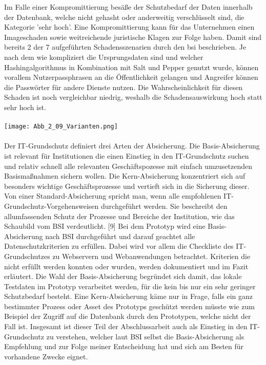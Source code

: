 Im Falle einer Kompromittierung besäße der Schutzbedarf der Daten innerhalb der Datenbank, welche nicht gehasht oder anderweitig verschlüsselt sind, die Kategorie 'sehr hoch'. Eine Kompromittierung kann für das Unternehmen einen Imageschaden sowie weitreichende juristische Klagen zur Folge haben. Damit sind bereits 2 der 7 aufgeführten Schadensszenarien durch den \ac{bsi} beschrieben. Je nach dem wie kompliziert die Ursprungsdaten sind und welcher Hashingalgorithmus in Kombination mit Salt und Pepper genutzt wurde, können vorallem Nutzerpassphrasen an die Öffentlichkeit gelangen und Angreifer können die Passwörter für andere Dienste nutzen. Die Wahrscheinlichkeit für diesen Schaden ist noch vergleichbar niedrig, weshalb die Schadensauswirkung hoch statt sehr hoch ist. \\ \\
\texttt{[image: Abb\_2\_09\_Varianten.png]} \\
\\
Der IT-Grundschutz definiert drei Arten der Absicherung. Die Basis-Absicherung ist relevant für Institutionen die einen Einstieg in den IT-Grundschutz suchen und relativ schnell alle relevanten Geschäftspozesse mit einfach umzusetzenden Basismaßnahmen sichern wollen. Die Kern-Absicherung konzentriert sich auf besonders wichtige Geschäftsprozesse und vertieft sich in die Sicherung dieser. Von einer Standard-Absicherung spricht man, wenn alle empfohlenen IT-Grundschutz-Vorgehensweisen durchgeführt werden. Sie beschreibt den allumfassenden Schutz der Prozesse und Bereiche der Institution, wie das Schaubild vom BSI verdeutlicht. [9] Bei dem Prototyp wird eine Basis-Absicherung nach BSI durchgeführt und darauf geachtet alle Datenschutzkriterien zu erfüllen. Dabei wird vor allem die Checkliste des IT-Grundschutzes zu Webservern und Webanwendungen betrachtet. Kriterien die nicht erfüllt werden konnten oder wurden, werden dokumentiert und im Fazit erläutert. Die Wahl der Basis-Absicherung begründet sich damit, das lokale Testdaten im Prototyp verarbeitet werden, für die kein bis nur ein sehr geringer Schutzbedarf besteht. Eine Kern-Absicherung käme nur in Frage, falls ein ganz bestimmter Prozess oder Asset des Prototyps geschützt werden müsste wie zum Beispiel der Zugriff auf die Datenbank durch den Prototypen, welche nicht der Fall ist. Insgesamt ist dieser Teil der Abschlussarbeit auch als Einstieg in den IT-Grundschutz zu verstehen, welcher laut BSI selbst die Basis-Absicherung als Empfehlung und zur Folge meiner Entscheidung hat und sich am Besten für vorhandene Zwecke eignet.

